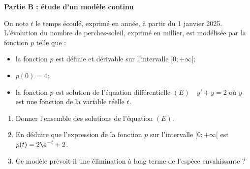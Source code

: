 \textbf{Partie B : étude d'un modèle continu}

On note $t$ le temps écoulé, exprimé en année, à partir du 1 janvier 2025. L'évolution du nombre de perches-soleil, exprimé en millier, est modélisée par la fonction $p$ telle que :

\begin{itemize}
\item la fonction $p$ est définie et dérivable sur l'intervalle $[0;+\infty[$;
\item $p(0)=4$;
\item la fonction $p$ est solution de l'équation différentielle $(E) \quad y'+y=2$ \quad où $y$ est une fonction de la variable réelle $t$.
\end{itemize}

\begin{enumerate}
\item Donner l'ensemble des solutions de l'équation $(E)$.
\item En déduire que l'expression de la fonction $p$ sur l'intervalle $[0;+\infty[$ est \quad $p(t)=2 \e^{-t}+2$.
\item Ce modèle prévoit-il une élimination à long terme de l'espèce envahissante ?
\end{enumerate}
